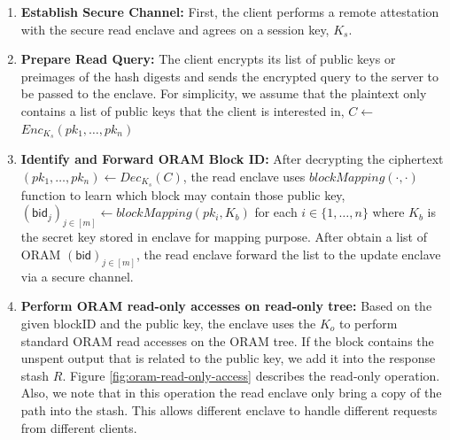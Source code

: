 \begin{enumerate}
	\item \textbf{Establish Secure Channel: } First, the client performs a remote attestation with the secure read enclave and agrees on a session key, $K_s$.

	\item \textbf{Prepare Read Query:} The client encrypts its list of public keys or preimages of the hash digests and sends the encrypted query to the server to be passed to the enclave. For simplicity, we assume that the plaintext only contains a list of public keys that the client is interested in, $C$$\leftarrow$$Enc_{K_s}(pk_1,\dots, pk_n)$

	\item \textbf{Identify and Forward ORAM Block ID:} After decrypting the ciphertext $(pk_1, \dots, pk_n)$$\leftarrow$$Dec_{K_s}(C)$, the read enclave uses $blockMapping(\cdot,\cdot)$ function to learn which block may contain those public key, $(\mathsf{bid}_j)_{j\in[m]} \leftarrow blockMapping(pk_i, K_b)$ for each $i \in \{1,\dots, n\}$ where $K_b$ is the secret key stored in enclave for mapping purpose. After obtain a list of ORAM $(\mathsf{bid})_{j \in [m]}$, the read enclave forward  the list to the update enclave via a secure channel.

	\item \textbf{Perform ORAM read-only accesses on read-only tree:} Based on the given blockID and the public key, the enclave uses the $K_o$ to perform standard ORAM read accesses on the ORAM tree. If the block contains the unspent output that is related to the public key, we add it into  the response stash $R$. Figure \ref{fig:oram-read-only-access} describes the read-only operation. Also, we note that in this operation the read enclave only bring a copy of the path into the stash. This allows different enclave to handle different requests from different clients.


\end{enumerate}

